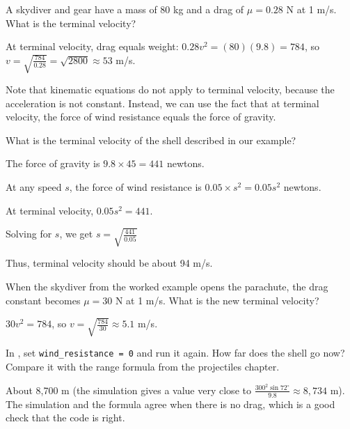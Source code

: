 \begin{Worked}
\begin{Problem}
A skydiver and gear have a mass of 80 kg and a
drag of $\mu = 0.28$ N at 1 m/s. What is the terminal velocity?
\end{Problem}
\begin{Solution}
At terminal velocity, drag equals weight:
$0.28 v^2 = (80)(9.8) = 784$, so $v = \sqrt{\frac{784}{0.28}} = \sqrt{2800}
\approx 53$ m/s.
\end{Solution}
\end{Worked}


Note that kinematic equations do not apply to terminal velocity, because the acceleration is not constant. Instead, we can use the fact that at terminal velocity, the force of wind resistance equals the force of gravity.
\begin{Exercise}[title={Terminal velocity}, label=terminal_velocity]
    What is the terminal velocity of the shell described in our example?
\end{Exercise}
\begin{Answer}[ref=terminal_velocity]
The force of gravity is $9.8 \times 45 = 441$ newtons.

At any speed $s$, the force of wind resistance is $0.05 \times s^2 = 0.05 s^2$ newtons.

At terminal velocity, $0.05 s^2 = 441$. 

Solving for $s$, we get $s = \sqrt{\frac{441}{0.05}}$

Thus, terminal velocity should be about 94 m/s.

\end{Answer}

\begin{Exercise}[title={Parachute}, label=drag2]
When the skydiver from the worked example opens the parachute, the drag
constant becomes $\mu = 30$ N at 1 m/s. What is the new terminal velocity?
\end{Exercise}
\begin{Answer}[ref=drag2]
$30 v^2 = 784$, so $v = \sqrt{\frac{784}{30}} \approx 5.1$ m/s.
\end{Answer}

\begin{Exercise}[title={Without air}, label=drag3]
In , set \texttt{wind_resistance = 0}
and run it again. How far does the shell go now? Compare it with the range
formula from the projectiles chapter.
\end{Exercise}
\begin{Answer}[ref=drag3]
About 8,700 m (the simulation gives a value very close to
$\frac{300^2 \sin 72^\circ}{9.8} \approx 8{,}734$ m). The simulation and the
formula agree when there is no drag, which is a good check that the code is
right.
\end{Answer}
